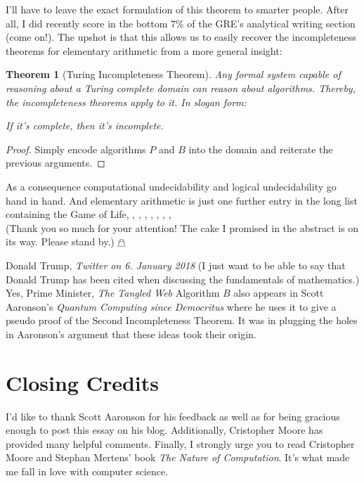 \documentclass{article}
\newtheorem{theorem}{Theorem}
\begin{document}
I'll have to leave the exact formulation of this theorem to smarter people. After all, I did recently score in the bottom 7\% of the GRE's analytical writing section (come on!). The upshot is that this allows us to easily recover the incompleteness theorems for elementary arithmetic from a more general insight:

\begin{theorem}[Turing Incompleteness Theorem]
Any formal system capable of reasoning about a Turing complete domain can reason about algorithms. Thereby, the incompleteness theorems apply to it. In slogan form: 
\begin{center}
If it's complete, then it's incomplete.
\end{center}
\end{theorem}

\begin{proof}
Simply encode algorithms $P$ and $B$ into the domain and reiterate the previous arguments.
\end{proof}

As a consequence computational undecidability and logical undecidability go hand in hand. And elementary arithmetic is just one further entry in the long list containing the Game of Life, \scalebox{0.95}{Fractran}, \scalebox{0.9}{Post Tag Systems}, \scalebox{0.85}{Magic the Gathering}, \scalebox{0.8}{the human brain}, \scalebox{0.75}{Rule 110}, \scalebox{0.7}{the Lambda Calculus}, \scalebox{0.65}{musical notation}, \scalebox{0.6}{...}\\[2em]
\footnotesize{(Thank you so much for your attention! The cake I promised in the abstract is on its way. Please stand by.) $\mathghost$}

\begin{thebibliography}{1}
Donald Trump, \textit{Twitter on 6. January 2018} (I just want to be able to say that Donald Trump has been cited when discussing the fundamentals of mathematics.)
Yes, Prime Minister, \textit{The Tangled Web}
 Algorithm $B$ also appears in Scott Aaronson's \textit{Quantum Computing since Democritus} where he uses it to give a pseudo proof of the Second Incompleteness Theorem. It was in plugging the holes in Aaronson's argument that these ideas took their origin.
\end{thebibliography}

\section*{Closing Credits}

I'd like to thank Scott Aaronson for his feedback as well as for being gracious enough to post this essay on his blog. Additionally, Cristopher Moore has provided many helpful comments. Finally, I strongly urge you to read Cristopher Moore and Stephan Mertens' book \textit{The Nature of Computation}. It's what made me fall in love with computer science.

\vfill\eject
\end{document}
